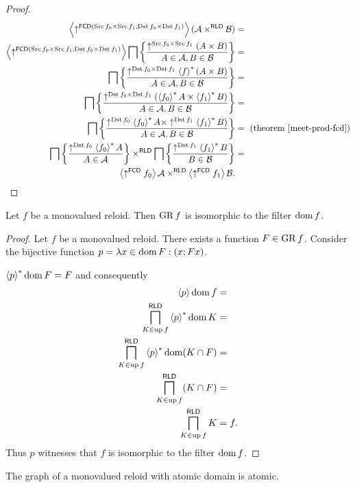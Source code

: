 \begin{proof}
~
\begin{align*}
\left\langle \uparrow^{\mathsf{FCD}(\operatorname{Src} f_{0}\times\operatorname{Src} f_{1};\operatorname{Dst} f_{0}\times\operatorname{Dst} f_{1})}\right\rangle(\mathcal{A}\times^{\mathsf{RLD}}\mathcal{B}) & =\\
\left\langle \uparrow^{\mathsf{FCD}(\operatorname{Src} f_{0}\times\operatorname{Src} f_{1};\operatorname{Dst} f_{0}\times\operatorname{Dst} f_{1})}\right\rangle\bigsqcap\left\{ \frac{\uparrow^{\operatorname{Src} f_{0}\times\operatorname{Src} f_{1}}(A\times B)}{A\in\mathcal{A},B\in\mathcal{B}}\right\} & =\\
\bigsqcap\left\{ \frac{\uparrow^{\operatorname{Dst} f_{0}\times\operatorname{Dst} f_{1}}\left\langle f\right\rangle ^{\ast}(A\times B)}{A\in\mathcal{A},B\in\mathcal{B}}\right\} & =\\
\bigsqcap\left\{ \frac{\uparrow^{\operatorname{Dst} f_{0}\times\operatorname{Dst} f_{1}}(\left\langle f_{0}\right\rangle ^{\ast}A\times\left\langle f_{1}\right\rangle ^{\ast}B)}{A\in\mathcal{A},B\in\mathcal{B}}\right\} & =\\
\bigsqcap\left\{ \frac{\uparrow^{\operatorname{Dst} f_{0}}\left\langle f_{0}\right\rangle ^{\ast}A\times\uparrow^{\operatorname{Dst} f_{1}}\left\langle f_{1}\right\rangle ^{\ast}B)}{A\in\mathcal{A},B\in\mathcal{B}}\right\} & =\text{ (theorem \ref{meet-prod-fcd})}\\
\bigsqcap\left\{ \frac{\uparrow^{\operatorname{Dst} f_{0}}\left\langle f_{0}\right\rangle ^{\ast}A}{A\in\mathcal{A}}\right\}\times^{\mathsf{RLD}}\bigsqcap\left\{ \frac{\uparrow^{\operatorname{Dst} f_{1}}\left\langle f_{1}\right\rangle ^{\ast}B}{B\in\mathcal{B}}\right\} & =\\
\left\langle \uparrow^{\mathsf{FCD}}f_{0}\right\rangle\mathcal{A}\times^{\mathsf{RLD}}\left\langle \uparrow^{\mathsf{FCD}}f_{1}\right\rangle\mathcal{B}.
\end{align*}
\end{proof}
\begin{thm}
\label{inj-iso-dom}Let $f$ be a monovalued reloid. Then $\operatorname{GR} f$
is isomorphic to the filter $\operatorname{dom} f$.\end{thm}
\begin{proof}
Let $f$ be a monovalued reloid. There exists a function $F\in\operatorname{GR} f$.
Consider the bijective function $p=\lambda x\in\operatorname{dom} F:(x;Fx)$.

$\left\langle p\right\rangle ^{\ast}\operatorname{dom} F=F$ and consequently
\begin{align*}
\left\langle p\right\rangle\operatorname{dom} f & =\\
\bigsqcap_{K\in\operatorname{up} f}^{\mathsf{RLD}}\left\langle p\right\rangle ^{\ast}\operatorname{dom} K & =\\
\bigsqcap_{K\in\operatorname{up} f}^{\mathsf{RLD}}\left\langle p\right\rangle ^{\ast}\operatorname{dom}(K\cap F) & =\\
\bigsqcap_{K\in\operatorname{up} f}^{\mathsf{RLD}}(K\cap F) & =\\
\bigsqcap_{K\in\operatorname{up} f}^{\mathsf{RLD}}K & =f.
\end{align*}
Thus $p$ witnesses that $f$ is isomorphic to the filter $\operatorname{dom} f$.\end{proof}
\begin{cor}
The graph of a monovalued reloid with atomic domain is atomic.
\end{cor}

